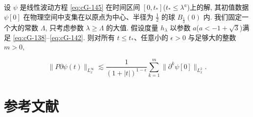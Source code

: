\begin{theorem}[B]\label{thm:cG-6.20}
设 $\psi$ 是线性波动方程 \eqref{eq:cG-145} 在时间区间 $[0,  t_{*}]$($t_{*} \leq \lambda^{a}$)上的解, 其初值数据 $\psi[0]$ 在物理空间中支集在以原点为中心、半径为 $\frac{1}{2}$ 的球 $B_{\frac{1}{2}}(0)$ 内. 我们固定一个大的常数 $\Lambda$, 只考虑参数 $\lambda \geq \Lambda$ 的大值. 假设度量 $h_{\lambda}$ 以参数 $a$($a < -1 + \sqrt{3}$)满足 \eqref{eq:cG-138}--\eqref{eq:cG-142}. 则对所有 $t \leq t_{*}$、任意小的 $\epsilon > 0$ 与足够大的整数 $m > 0$, 

\begin{equation}
\|P\partial\psi(t)\|_{L_{x}^{\infty}} \lesssim \frac{1}{(1 + |t|)^{1 - \epsilon}}\sum_{k = 1}^{m}\|\partial^{k}\psi[0]\|_{L_{x}^{2}}.\label{eq:cG-147}
\end{equation}
\end{theorem}

\section*{参考文献}

